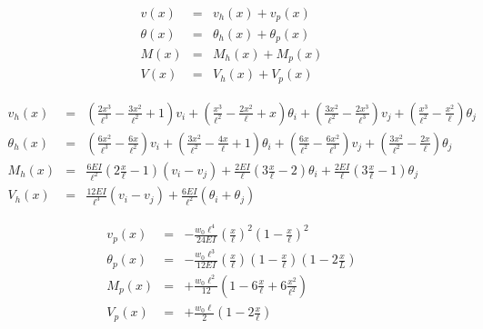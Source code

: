 \documentclass[11pt, oneside]{article}   	%
\begin{document}
\begin{eqnarray}
   v(x) &=& v_h(x) + v_p(x) \\
   \theta(x) 
   &=&  \theta_h(x) + \theta_p(x) \\
   M(x) 
   &=&  M_h(x) + M_p(x) \\
   V(x) 
   &=& V_h(x) + V_p(x) 
   \label{C1}
\end{eqnarray}


\begin{eqnarray}
   v_h(x) &=&  
    \left(\frac{2 x^3}{\ell^3}-\frac{3 x^2}{\ell^2}+1\right) {v_i}
   +  \left(\frac{x^3}{\ell^2}-\frac{2 x^2}{\ell}+x\right) {\theta_i}
   + \left(\frac{3 x^2}{\ell^2}-\frac{2 x^3}{\ell^3}\right) {v_j}
   + \left(\frac{x^3}{\ell^2}-\frac{x^2}{\ell}\right) {\theta_j}
    \\
   \theta_h(x) 
   &=&  
    \left(\frac{6  x^2}{\ell^3}-\frac{6 x}{\ell^2}\right) {v_i}
   + \left(\frac{3 x^2}{\ell^2}-\frac{4 x}{\ell}+1\right) {\theta_i}
   + \left(\frac{6 x}{\ell^2}-\frac{6 x^2}{\ell^3}\right) {v_j}
   +\left(\frac{3 x^2}{\ell^2}-\frac{2 x}{\ell}\right) {\theta_j} 
    \\
   M_h(x) 
   &=&  
    \frac{6 {EI}}{\ell^2}  \left(2 \frac{x}{\ell} - 1 \right) \left( {v_i} - {v_j}  \right)
   +  \frac{2 {EI}}{\ell}  \left( 3 \frac{x}{\ell} - 2 \right) {\theta_i}
   +  \frac{2 {EI}}{\ell}  \left( 3 \frac{x}{\ell} - 1 \right) {\theta_j}
    \\
   V_h(x) 
   &=& 
   \frac{12 {EI} }{\ell^3} \left( {v_i} - {v_j} \right) 
   +   \frac{6 {EI} }{\ell^2} \left( {\theta_i} + {\theta_j} \right)
   \label{C1}
\end{eqnarray}


\begin{eqnarray}
   v_p(x) &=&  
   - \frac{w_0 \ell^4}{24 EI} \left( \frac{x}{\ell} \right)^2 \left( 1 - \frac{x}{\ell} \right)^2
    \\
   \theta_p(x) 
   &=&  
   - \frac{w_0 \ell^3}{12 EI} \left( \frac{x}{\ell} \right) \left( 1 - \frac{x}{\ell} \right) \left( 1 - 2 \frac{x}{L} \right)
    \\
   M_p(x) 
   &=&  
   + \frac{w_0 \ell^2}{12} \left( 1 - 6 \frac{x}{\ell} + 6 \frac{x^2}{\ell^2} \right)
    \\
   V_p(x) 
   &=& 
   + \frac{w_0 \ell}{2}  \left( 1 - 2 \frac{x}{\ell} \right)
   \label{C1}
\end{eqnarray}
\end{document}
